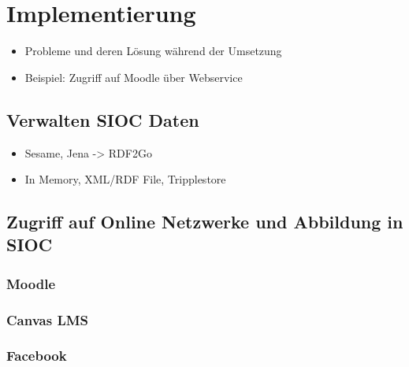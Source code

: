 
\chapter{Implementierung} %
\label{cha:implementierung}


\begin{itemize}
    \item Probleme und deren Lösung während der Umsetzung
    \item Beispiel: Zugriff auf Moodle über Webservice
\end{itemize}



\section{Verwalten SIOC Daten} %
\label{sec:zugriff_auf_sioc_daten}

\begin{itemize}
    \item Sesame, Jena -> RDF2Go
    \item In Memory, XML/RDF File, Tripplestore 
\end{itemize}


\section{Zugriff auf Online Netzwerke und Abbildung in SIOC} %
\label{sec:zugriff_auf_online_netzwerke_und_abbildung_in_sioc}

\subsection{Moodle} %
\label{sub:moodle}

\subsection{Canvas LMS} %
\label{sub:canvas_lms}

\subsection{Facebook} %
\label{sub:facebook}


